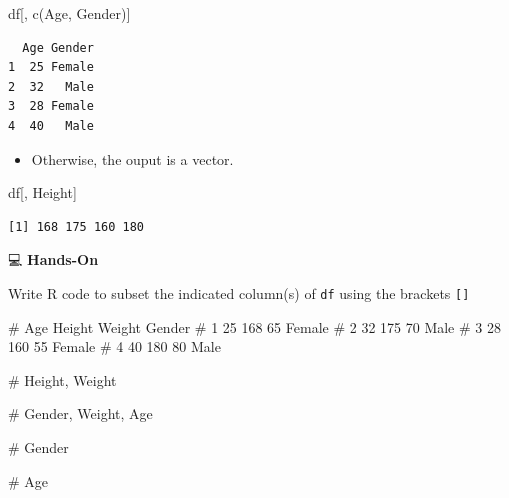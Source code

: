 \documentclass[
  letterpaper,
  DIV=11,
  numbers=noendperiod]{scrreprt}
\newenvironment{Shaded}{\begin{snugshade}}{\end{snugshade}}
\newcommand{\CommentTok}[1]{\textcolor[rgb]{0.37,0.37,0.37}{#1}}
\newcommand{\FunctionTok}[1]{\textcolor[rgb]{0.28,0.35,0.67}{#1}}
\newcommand{\NormalTok}[1]{\textcolor[rgb]{0.00,0.23,0.31}{#1}}
\newcommand{\StringTok}[1]{\textcolor[rgb]{0.13,0.47,0.30}{#1}}
\providecommand{\tightlist}{%
  \setlength{\itemsep}{0pt}\setlength{\parskip}{0pt}}\usepackage{longtable,booktabs,array}
\begin{document}
\begin{Shaded}
\begin{Highlighting}[]
\NormalTok{df[, }\FunctionTok{c}\NormalTok{(}\StringTok{\textquotesingle{}Age\textquotesingle{}}\NormalTok{, }\StringTok{\textquotesingle{}Gender\textquotesingle{}}\NormalTok{)]}
\end{Highlighting}
\end{Shaded}

\begin{verbatim}
  Age Gender
1  25 Female
2  32   Male
3  28 Female
4  40   Male
\end{verbatim}

\begin{itemize}
\tightlist
\item
  Otherwise, the ouput is a vector.
\end{itemize}

\begin{Shaded}
\begin{Highlighting}[]
\NormalTok{df[, }\StringTok{\textquotesingle{}Height\textquotesingle{}}\NormalTok{]}
\end{Highlighting}
\end{Shaded}

\begin{verbatim}
[1] 168 175 160 180
\end{verbatim}

💻 \textbf{Hands-On}

Write R code to subset the indicated column(s) of \texttt{df} using the
brackets \texttt{{[}{]}}

\begin{Shaded}
\begin{Highlighting}[]
\CommentTok{\#   Age Height Weight Gender}
\CommentTok{\# 1  25    168     65 Female}
\CommentTok{\# 2  32    175     70   Male}
\CommentTok{\# 3  28    160     55 Female}
\CommentTok{\# 4  40    180     80   Male}

\CommentTok{\# Height, Weight}

\CommentTok{\# Gender, Weight, Age}

\CommentTok{\# Gender}

\CommentTok{\# Age}
\end{Highlighting}
\end{Shaded}
\end{document}
